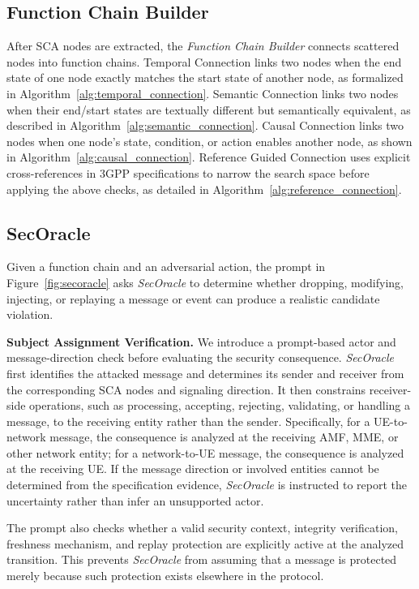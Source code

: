 \subsection{Function Chain Builder}

After SCA nodes are extracted, the \textit{Function Chain Builder} connects scattered nodes into function chains. Temporal Connection links two nodes when the end state of one node exactly matches the start state of another node, as formalized in Algorithm~\ref{alg:temporal_connection}. Semantic Connection links two nodes when their end/start states are textually different but semantically equivalent, as described in Algorithm~\ref{alg:semantic_connection}. Causal Connection links two nodes when one node's state, condition, or action enables another node, as shown in Algorithm~\ref{alg:causal_connection}. Reference Guided Connection uses explicit cross-references in 3GPP specifications to narrow the search space before applying the above checks, as detailed in Algorithm~\ref{alg:reference_connection}.




\subsection{SecOracle}

Given a function chain and an adversarial action, the prompt in
Figure~\ref{fig:secoracle} asks \textit{SecOracle} to determine whether dropping, modifying, injecting, or replaying a message or event can produce a realistic candidate violation.

\noindent \textbf{Subject Assignment Verification.} We introduce a prompt-based actor and message-direction check before evaluating the security consequence. \textit{SecOracle} first identifies the attacked message and determines its sender and receiver from the corresponding SCA nodes and signaling direction. It then constrains receiver-side operations, such as processing, accepting, rejecting, validating, or handling a message, to the receiving entity rather than the sender.
Specifically, for a UE-to-network message, the consequence is analyzed at the receiving AMF, MME, or other network entity; for a
network-to-UE message, the consequence is analyzed at the receiving UE. If the message direction or involved entities cannot be determined from the specification evidence, \textit{SecOracle} is instructed to report the uncertainty rather than infer an unsupported actor.

The prompt also checks whether a valid security context, integrity
verification, freshness mechanism, and replay protection are explicitly active at the analyzed transition. This prevents \textit{SecOracle} from assuming that a message is protected merely because such protection exists elsewhere in the protocol.

